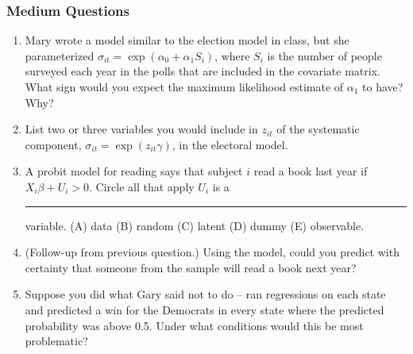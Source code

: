 \documentclass[11pt]{article}
\begin{document}
\subsubsection{Medium Questions}
\begin{enumerate}
\item Mary wrote a model similar to the election model in class, but she parameterized $\sigma_{it} = \exp{(\alpha_0 + \alpha_1S_i)}$, where $S_i$ is the number of people surveyed each year in the polls that are included in the covariate matrix.  What sign would you expect the maximum likelihood estimate of $\alpha_1$ to have?  Why? 
\item List two or three variables you would include in $z_{it}$ of the systematic component, $\sigma_{it} = \exp{(z_{it}\gamma)}$, in the electoral model. 
\item A probit model for reading says that subject $i$ read a book last year if $X_i\beta + U_i > 0$.  Circle all that apply $U_i$ is a \rule{10mm}{.1pt} variable.  (A) data (B) random (C) latent (D) dummy (E) observable.  
\item (Follow-up from previous question.)  Using the model, could you predict with certainty that someone from the sample will read a book next year? 
\item Suppose you did what Gary said not to do -- ran regressions on each state and predicted a win for the Democrats in every state where the predicted probability was above 0.5.  Under what conditions would this be most problematic?  
\end{enumerate}
\end{document}
